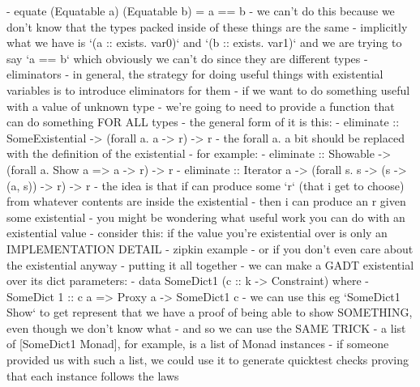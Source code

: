   - equate (Equatable a) (Equatable b) = a == b
- we can't do this because we don't know that the types packed inside of these things are the same
  - implicitly what we have is `(a :: exists. var0)` and `(b :: exists. var1)` and we are trying to say `a == b` which obviously we can't do since they are different types
- eliminators
  - in general, the strategy for doing useful things with existential variables is to introduce eliminators for them
  - if we want to do something useful with a value of unknown type
    - we're going to need to provide a function that can do something FOR ALL types
  - the general form of it is this:
    - eliminate :: SomeExistential -> (forall a. a -> r) -> r
    - the forall a. a bit should be replaced with the definition of the existential
    - for example:
      - eliminate :: Showable -> (forall a. Show a => a -> r) -> r
      - eliminate :: Iterator a -> (forall s. s -> (s -> (a, s)) -> r) -> r
  - the idea is that if can produce some `r` (that i get to choose) from whatever contents are inside the existential
    - then i can produce an r given some existential
- you might be wondering what useful work you can do with an existential value
  - consider this: if the value you're existential over is only an IMPLEMENTATION DETAIL
    - zipkin example
  - or if you don't even care about the existential anyway
- putting it all together
  - we can make a GADT existential over its dict parameters:
  - data SomeDict1 (c :: k -> Constraint) where
    - SomeDict 1 :: c a => Proxy a -> SomeDict1 c
  - we can use this eg `SomeDict1 Show` to get represent that we have a proof of being able to show SOMETHING, even though we don't know what
  - and so we can use the SAME TRICK
    - a list of [SomeDict1 Monad], for example, is a list of Monad instances
    - if someone provided us with such a list, we could use it to generate quicktest checks proving that each instance follows the laws
